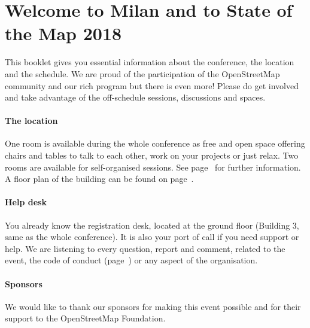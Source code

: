 \newpage
\newpage
\section*{Welcome to Milan and to State of the Map 2018} \label{welcome}
This booklet gives you essential information
about the conference, the location and the schedule.  We are proud of the participation of the
OpenStreetMap community and our rich program but there is even more!  Please do get involved and
take advantage of the off-schedule sessions, discussions and spaces.

\paragraph*{The location} \label{welcome-location}
One room is available during the whole conference as free and open space offering chairs and tables
to talk to each other, work on your projects or just relax.  Two rooms are available for
self-organised sessions.  See page~\pageref{self-organised} for further information.  A floor plan
of the building can be found on page~\pageref{floorplan}.

\paragraph*{Help desk} \label{welcome-helpdesk}
You already know the registration desk, located at the ground floor (Building 3, same as the whole
conference).  It is also your port of call if you need support or help. We are listening to every
question, report and comment, related to the event, the code of conduct (page~\pageref{coc}) or any
aspect of the organisation.

\paragraph*{Sponsors} \label{welcome-sponsors}
We would like to thank our sponsors for making this event possible and for their support to the
OpenStreetMap Foundation.
\newpage
